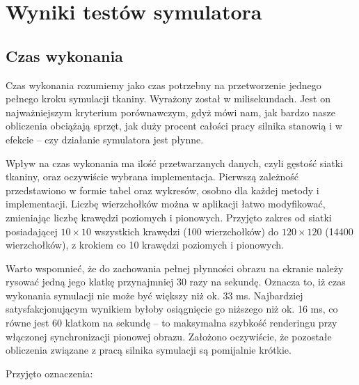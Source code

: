 \chapter{Wyniki testów symulatora}
\label{t:wyniki}

	\section{Czas wykonania}
	\label{t:wyniki:czas_wykonania}

		Czas wykonania rozumiemy jako czas potrzebny na przetworzenie jednego pełnego kroku symulacji tkaniny. Wyrażony został w milisekundach. Jest on najważniejszym kryterium porównawczym, gdyż mówi nam, jak bardzo nasze obliczenia obciążają sprzęt, jak duży procent całości pracy silnika stanowią i w efekcie -- czy działanie symulatora jest płynne. 
		
		Wpływ na czas wykonania ma ilość przetwarzanych danych, czyli gęstość siatki tkaniny, oraz oczywiście wybrana implementacja. Pierwszą zależność przedstawiono w formie tabel oraz wykresów, osobno dla każdej metody i implementacji. Liczbę wierzchołków można w aplikacji łatwo modyfikować, zmieniając liczbę krawędzi poziomych i pionowych. Przyjęto zakres od siatki posiadającej \(10 \times 10 \) wszystkich krawędzi (100 wierzchołków) do \( 120 \times 120 \) (14400 wierzchołków), z krokiem co 10 krawędzi poziomych i pionowych.
		
		Warto wspomnieć, że do zachowania pełnej płynności obrazu na ekranie należy rysować jedną jego klatkę przynajmniej 30 razy na sekundę. Oznacza to, iż czas wykonania symulacji nie może być większy niż ok. 33 ms. Najbardziej satysfakcjonującym wynikiem byłoby osiągnięcie go niższego niż ok. 16 ms, co równe jest 60 klatkom na sekundę -- to maksymalna szybkość renderingu przy włączonej synchronizacji pionowej obrazu. Założono oczywiście, że pozostałe obliczenia związane z pracą silnika symulacji są pomijalnie krótkie.
		
		Przyjęto oznaczenia:
		
